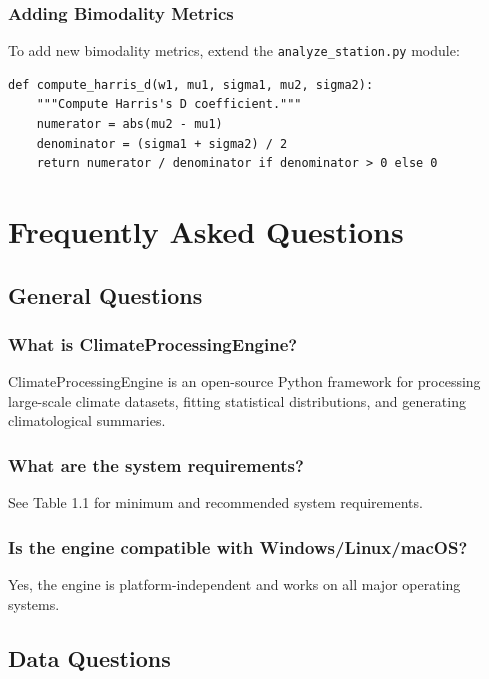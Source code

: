 ﻿\documentclass[12pt,a4paper]{report}
\begin{document}
\subsection{Adding Bimodality Metrics}
To add new bimodality metrics, extend the \texttt{analyze\_station.py} module:

\begin{lstlisting}[caption=Adding a New Bimodality Metric]
def compute_harris_d(w1, mu1, sigma1, mu2, sigma2):
    """Compute Harris's D coefficient."""
    numerator = abs(mu2 - mu1)
    denominator = (sigma1 + sigma2) / 2
    return numerator / denominator if denominator > 0 else 0
\end{lstlisting}

\chapter{Frequently Asked Questions}

\section{General Questions}

\subsection{What is ClimateProcessingEngine?}
ClimateProcessingEngine is an open-source Python framework for processing large-scale climate datasets, fitting statistical distributions, and generating climatological summaries.

\subsection{What are the system requirements?}
See Table 1.1 for minimum and recommended system requirements.

\subsection{Is the engine compatible with Windows/Linux/macOS?}
Yes, the engine is platform-independent and works on all major operating systems.

\section{Data Questions}
\end{document}
